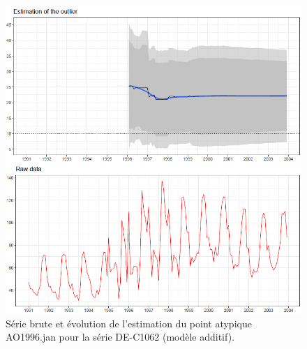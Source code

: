 \documentclass[12pt, a4paper, french]{article}
\begin{document}
\begin{figure}[!hb]
\begin{center}
 \includegraphics[width=16cm]{img/DE-C1062-EstimateAO.PNG}
 \caption[Série brute et évolution de l'estimation du point atypique AO1996.jan pour la série DE-C1062 (modèle additif)]{Série brute et évolution de l'estimation du point atypique AO1996.jan pour la série DE-C1062 (modèle additif).}
 \label{fig:DE-C1062}
\end{center}
\end{figure}
\end{document}
